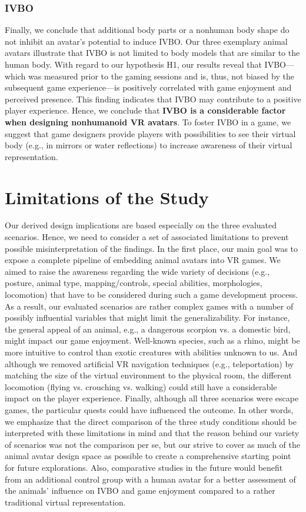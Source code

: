 \documentclass{sigchi}
\begin{document}
\subsubsection{IVBO}
Finally, we conclude that additional body parts or a nonhuman body shape do not inhibit an avatar's potential to induce IVBO. Our three exemplary animal avatars illustrate that IVBO is not limited to body models that are similar to the human body. With regard to our hypothesis H1, our results reveal that IVBO---which was measured prior to the gaming sessions and is, thus, not biased by the subsequent game experience---is positively correlated with game enjoyment and perceived presence. This finding indicates that IVBO may contribute to a positive player experience.
Hence, we conclude that \textbf{IVBO is a considerable factor when designing nonhumanoid VR avatars}.
To foster IVBO in a game, we suggest that game designers provide players with possibilities to see their virtual body (e.g., in mirrors or water reflections) to increase awareness of their virtual representation.


\section{Limitations of the Study}
Our derived design implications are based especially on the three evaluated scenarios. Hence, we need to consider a set of associated limitations to prevent possible misinterpretation of the findings. In the first place, our main goal was to expose a complete pipeline of embedding animal avatars into VR games. We aimed to raise the awareness regarding the wide variety of decisions (e.g., posture, animal type, mapping/controls, special abilities, morphologies, locomotion) that have to be considered during such a game development process. As a result, our evaluated scenarios are rather complex games with a number of possibly influential variables that might limit the generalizability. For instance, the general appeal of an animal, e.g., a dangerous scorpion vs. a domestic bird, might impact our game enjoyment. Well-known species, such as a rhino, might be more intuitive to control than exotic creatures with abilities unknown to us. And although we removed artificial VR navigation techniques (e.g., teleportation) by matching the size of the virtual environment to the physical room, the different locomotion (flying vs. crouching vs. walking) could still have a considerable impact on the player experience. Finally, although all three scenarios were escape games, the particular quests could have influenced the outcome. In other words, we emphasize that the direct comparison of the three study conditions should be interpreted with these limitations in mind and that the reason behind our variety of scenarios was not the comparison per se, but our strive to cover as much of the animal avatar design space as possible to create a comprehensive starting point for future explorations.  Also, comparative studies in the future would benefit from an additional control group with a human avatar for a better assessment of the animals’ influence on IVBO and game enjoyment compared to a rather traditional virtual representation.
\end{document}
